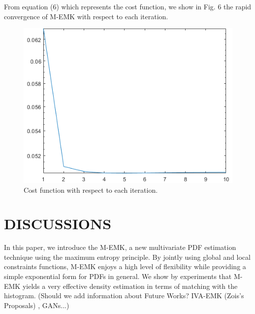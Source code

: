 \documentclass[conference]{IEEEtran}
\begin{document}
From equation (6) which represents the  cost function, we show in Fig. 6 the rapid convergence of M-EMK with respect to each iteration.
\begin{figure}[H]
	\centering
	\includegraphics[width=0.8\linewidth]{CostFunction}
	\caption{Cost function with respect to each iteration.}
	\label{fig:mesh1}
\end{figure}


\section{DISCUSSIONS}
\label{sec:conc}
In this paper, we introduce the M-EMK, a new multivariate PDF estimation technique using the maximum entropy principle. By jointly using global and local constraints functions, M-EMK enjoys a high level of flexibility while providing a simple exponential form for PDFs in general. We show by experiments that M-EMK yields a very effective density estimation in terms of matching with the histogram. (Should we add information about Future Works? IVA-EMK (Zois's Proposals) , GANs...)


	
	


	
	
	
\end{document}
